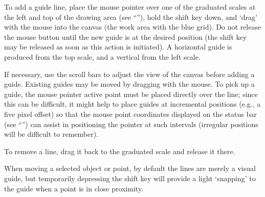 			To add a guide line, place the mouse pointer
			over one of the graduated scales at the left
			and top of the drawing area
			(see ``''),
			hold the shift key
			down, and `drag' with the mouse into the canvas
			(the work area with the blue grid). Do not release
			the mouse button until the new guide is at the
			desired position (the shift key may be released
			as soon as this action is initiated). A horizontal
			guide is produced from the top scale, and a vertical
			 from the left scale.
			
			If necessary, use the scroll bars to adjust the
			view of the canvas before adding a guide. Existing guides
			may be moved by dragging with the mouse. To
			pick up a guide, the mouse pointer active point
			must be placed directly over the line; since this
			can be difficult, it might help to place guides
			at incremental positions (e.g., a five pixel offset)
			so that the mouse point coordinates displayed on the
			status bar (see ``'')
			can assist in positioning the pointer at such
			intervals (irregular positions will be difficult
			to remember).
			
			To remove a  line, drag it back to the
			graduated scale and release it there.
			
			When moving a selected object or point, by default
			the  lines are merely a visual guide,
			but temporarily depressing the shift key will
			provide a light `snapping' to the guide when a
			point is in close proximity.
















